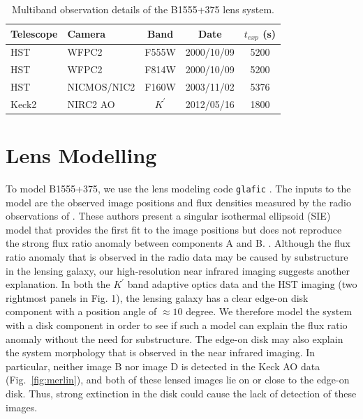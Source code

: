 \documentclass[useAMS,usenatbib]{mn2e}
\begin{document}
\begin{table}
 \centering
  \caption{Multiband observation details of the B1555+375 lens system.}
  \begin{tabular}{@{}llccc}
  
\hline
  Telescope     &      Camera     &  Band & Date &$t_{exp}$ (s) \\

 \hline
   HST				&		WFPC2    &  F555W		&	2000/10/09 	&	5200\\
   HST				&		WFPC2    &  F814W		&	2000/10/09 &	5200\\
   HST				&		NICMOS/NIC2	&	F160W	&	2003/11/02 & 5376\\
   Keck2			&		NIRC2 AO	&   $K^\prime$	& 2012/05/16	&  1800\\
   \hline
\end{tabular}
\end{table}


\section{Lens Modelling}

To model B1555+375, we use the lens modeling code {\tt glafic}
\citep{Oguri}.  The inputs to the model are the observed image
positions and flux densities measured by the radio observations of
\citet{Marlow99}.  These authors present a singular isothermal ellipsoid
(SIE) model that provides the first fit to the image positions but
does not reproduce the strong flux ratio anomaly between components A
and B.  \citep[see Fig.~6 and Tables 2 \& 3 in][]{Marlow99}.  Although
the flux ratio anomaly that is observed in the radio data may be
caused by substructure in the lensing galaxy, our high-resolution near
infrared imaging suggests another explanation.  In both the $K^\prime$
band adaptive optics data and the HST imaging (two rightmost panels in
Fig. 1), the lensing galaxy has a clear edge-on disk component with a
position angle of $\approx 10$ degree.  We therefore model the system
with a disk component in order to see if such a model can explain the
flux ratio anomaly without the need for substructure.  The edge-on
disk may also explain the system morphology that is observed in the
near infrared imaging.  In particular, neither image B nor image D is
detected in the Keck AO data (Fig.~\ref{fig:merlin}), and both of
these lensed images lie on or close to the edge-on disk.  Thus, strong
extinction in the disk could cause the lack of detection of these
images.
\end{document}
